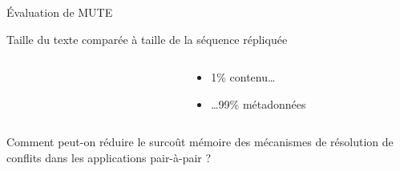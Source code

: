 \begin{frame}{Évaluation de MUTE}
    \begin{block}{Taille du texte comparée à taille de la séquence répliquée}
        \begin{columns}
            \begin{column}{0.6\textwidth}
                \begin{figure}
                \end{figure}
            \end{column}
            \begin{column}{0.4\textwidth}
                \begin{itemize}
                    \item 1\% contenu\dots
                    \item \dots 99\% métadonnées
                \end{itemize}
            \end{column}
        \end{columns}
    \end{block}
\end{frame}

\begin{frame}[standout]
    Comment peut-on réduire le surcoût mémoire des mécanismes de résolution de conflits dans les applications pair-à-pair ?
\end{frame}
